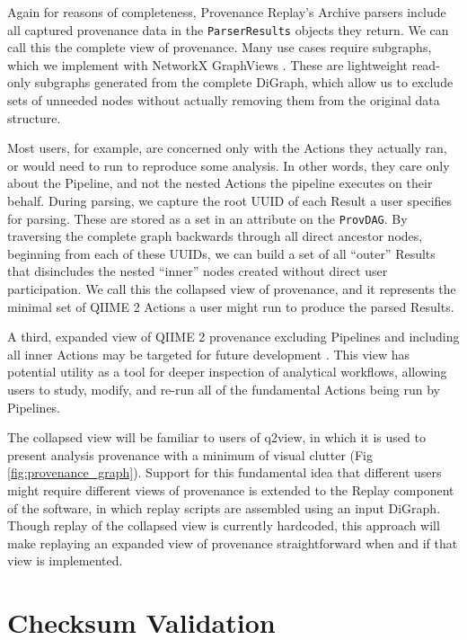 Again for reasons of completeness, Provenance Replay’s Archive parsers include
all captured provenance data in the \texttt{ParserResults} objects they return. We can
call this the complete view of provenance. Many use cases require subgraphs,
which we implement with NetworkX GraphViews \parencite{hagberg_exploring_2008}.
These are lightweight read-only subgraphs generated from the complete DiGraph,
which allow us to exclude sets of unneeded nodes without actually removing them
from the original data structure.

Most users, for example, are concerned only with the Actions they actually ran,
or would need to run to reproduce some analysis. In other words, they care only
about the Pipeline, and not the nested Actions the pipeline executes on their
behalf. During parsing, we capture the root UUID of each Result a user specifies
for parsing. These are stored as a set in an attribute on the \texttt{ProvDAG}. By
traversing the complete graph backwards through all direct ancestor nodes,
beginning from each of these UUIDs, we can build a set of all “outer” Results
that disincludes the nested “inner” nodes created without direct user
participation. We call this the collapsed view of provenance, and it represents
the minimal set of QIIME 2 Actions a user might run to produce the parsed
Results.

A third, expanded view of QIIME 2 provenance excluding Pipelines and including
all inner Actions may be targeted for future development \parencite[Issue #74]{keefe_issues_2021}.
This view has potential utility as a tool for deeper inspection of analytical
workflows, allowing users to study, modify, and re-run all of the fundamental
Actions being run by Pipelines. 

The collapsed view will be familiar to users of q2view, in which it is used to
present analysis provenance with a minimum of visual clutter (Fig \ref{fig:provenance_graph}).
Support for this fundamental idea that different users might require different
views of provenance is extended to the Replay component of the software, in
which replay scripts are assembled using an input DiGraph. Though replay of the
collapsed view is currently hardcoded, this approach will make replaying an
expanded view of provenance straightforward when and if that view is
implemented.


\section{Checksum Validation}

